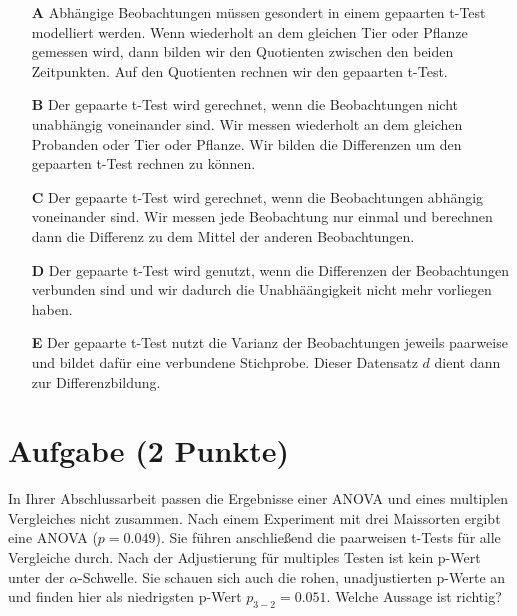\documentclass[a4paper, 9pt]{scrartcl}\usepackage[]{graphicx}\usepackage[]{xcolor}
\begin{document}
\begin{enumerate}
\item [\textbf{A} \msquare] Abhängige Beobachtungen müssen gesondert in einem gepaarten t-Test modelliert werden. Wenn wiederholt an dem gleichen Tier oder Pflanze gemessen wird, dann bilden wir den Quotienten zwischen den beiden Zeitpunkten. Auf den Quotienten rechnen wir den gepaarten t-Test.
\item [\textbf{B} \msquare] Der gepaarte t-Test wird gerechnet, wenn die Beobachtungen nicht unabhängig voneinander sind. Wir messen wiederholt an dem gleichen Probanden oder Tier oder Pflanze. Wir bilden die Differenzen um den gepaarten t-Test rechnen zu können.
\item [\textbf{C} \msquare] Der gepaarte t-Test wird gerechnet, wenn die Beobachtungen abhängig voneinander sind. Wir messen jede Beobachtung nur einmal und berechnen dann die Differenz zu dem Mittel der anderen Beobachtungen.
\item [\textbf{D} \msquare] Der gepaarte t-Test wird genutzt, wenn die Differenzen der Beobachtungen verbunden sind und wir dadurch die Unabhäängigkeit nicht mehr vorliegen haben.
\item [\textbf{E} \msquare] Der gepaarte t-Test nutzt die Varianz der Beobachtungen jeweils paarweise und bildet dafür eine verbundene Stichprobe. Dieser Datensatz $d$ dient dann zur Differenzbildung.
\end{enumerate}

\section{Aufgabe \hfill (2 Punkte)}



In Ihrer Abschlussarbeit passen die Ergebnisse einer ANOVA und eines multiplen Vergleiches nicht zusammen. Nach einem Experiment mit drei Maissorten ergibt eine ANOVA ($p = 0.049$). Sie führen anschließend die paarweisen t-Tests für alle Vergleiche durch. Nach der Adjustierung für multiples Testen ist kein p-Wert unter der $\alpha$-Schwelle. Sie schauen sich auch die rohen, unadjustierten p-Werte an und finden hier als niedrigsten p-Wert $p_{3-2} = 0.051$. Welche Aussage ist richtig?
\end{document}

